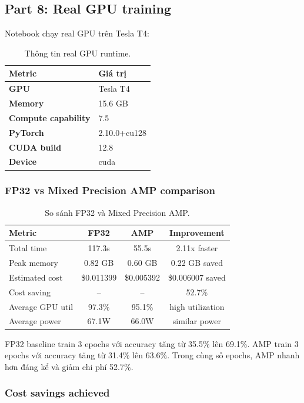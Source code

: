 \documentclass[12pt,a4paper]{article}
\newcommand{\metric}[2]{\textbf{#1} & #2 \\}
\begin{document}
\subsection{Part 8: Real GPU training}

Notebook chạy real GPU trên Tesla T4:

\begin{table}[H]
\centering
\begin{tabular}{ll}
\toprule
\textbf{Metric} & \textbf{Giá trị} \\
\midrule
\metric{GPU}{Tesla T4}
\metric{Memory}{15.6 GB}
\metric{Compute capability}{7.5}
\metric{PyTorch}{2.10.0+cu128}
\metric{CUDA build}{12.8}
\metric{Device}{cuda}
\bottomrule
\end{tabular}
\caption{Thông tin real GPU runtime.}
\end{table}

\subsubsection*{FP32 vs Mixed Precision AMP comparison}

\begin{table}[H]
\centering
\begin{tabular}{lccc}
\toprule
\textbf{Metric} & \textbf{FP32} & \textbf{AMP} & \textbf{Improvement} \\
\midrule
Total time & 117.3s & 55.5s & 2.11x faster \\
Peak memory & 0.82 GB & 0.60 GB & 0.22 GB saved \\
Estimated cost & \$0.011399 & \$0.005392 & \$0.006007 saved \\
Cost saving & -- & -- & 52.7\% \\
Average GPU util & 97.3\% & 95.1\% & high utilization \\
Average power & 67.1W & 66.0W & similar power \\
\bottomrule
\end{tabular}
\caption{So sánh FP32 và Mixed Precision AMP.}
\end{table}

FP32 baseline train 3 epochs với accuracy tăng từ 35.5\% lên 69.1\%.
AMP train 3 epochs với accuracy tăng từ 31.4\% lên 63.6\%.
Trong cùng số epochs, AMP nhanh hơn đáng kể và giảm chi phí 52.7\%.

\subsubsection*{Cost savings achieved}
\end{document}
